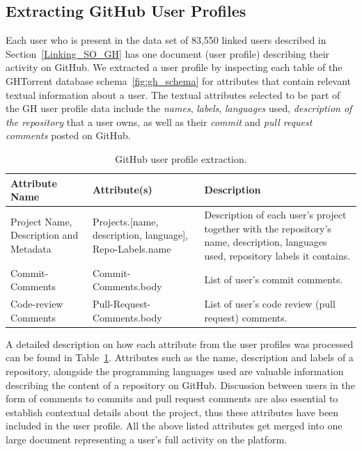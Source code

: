     \subsection{Extracting GitHub User Profiles} \label{GH_userProfileExtraction}
    
        Each user who is present in the data set of 83,550 linked users described in Section~\ref{Linking_SO_GH} has one document (user profile) describing their activity on GitHub. We extracted a user profile by inspecting each table of the GHTorrent database schema~\ref{fig:gh_schema} for attributes that contain relevant textual information about a user. The textual attributes selected to be part of the GH user profile data include the \textit{names}, \textit{labels}, \textit{languages} used,  \textit{description of the repository} that a user owns, as well as their \textit{commit} and \textit{pull request comments} posted on GitHub. 
        
        \begin{table}[!htbp]
            \centering
            \caption{GitHub user profile extraction.}
            \label{tab:GH_userProfileExtraction}
            \vspace{6pt} %
            \begin{tabular}{|p{3.3cm}|p{3.3cm}|p{7cm}|}
               \toprule
               \textbf{Attribute Name} & \textbf{Attribute(s)} & \textbf{Description} \\
               \toprule
                Project Name, Description and Metadata & Projects.[name, description, language], Repo-Labels.name & Description of each user's project together with the repository's name, description, languages used, repository labels it contains.\\  
                Commit-Comments & Commit-Comments.body & List of user's commit comments.\\
                Code-review Comments & Pull-Request-Comments.body & List of user's code review (pull request) comments. \\
               \bottomrule
            \end{tabular}
        \end{table}
        
        A detailed description on how each attribute from the user profiles was processed can be found in Table~\ref{tab:GH_userProfileExtraction}. Attributes such as the name, description and labels of a repository, alongside the programming languages used are valuable information describing the content of a repository on GitHub. Discussion between users in the form of comments to commits and pull request comments are also essential to establish contextual details about the project, thus these attributes have been included in the user profile. All the above listed attributes get merged into one large document representing a user's full activity on the platform. 
        
